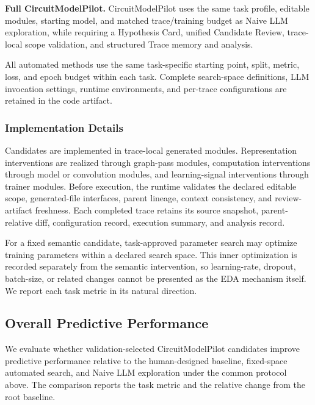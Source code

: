 \noindent\textbf{Full CircuitModelPilot.} CircuitModelPilot uses the same task profile, editable modules, starting model, and matched trace/training budget as Naive LLM exploration, while requiring a Hypothesis Card, unified Candidate Review, trace-local scope validation, and structured Trace memory and analysis.

All automated methods use the same task-specific starting point, split, metric, loss, and epoch budget within each task. Complete search-space definitions, LLM invocation settings, runtime environments, and per-trace configurations are retained in the code artifact.

\subsubsection{Implementation Details}
\label{sec:exp_implementation}

Candidates are implemented in trace-local generated modules. Representation interventions are realized through graph-pass modules, computation interventions through model or convolution modules, and learning-signal interventions through trainer modules. Before execution, the runtime validates the declared editable scope, generated-file interfaces, parent lineage, context consistency, and review-artifact freshness. Each completed trace retains its source snapshot, parent-relative diff, configuration record, execution summary, and analysis record.

For a fixed semantic candidate, task-approved parameter search may optimize training parameters within a declared search space. This inner optimization is recorded separately from the semantic intervention, so learning-rate, dropout, batch-size, or related changes cannot be presented as the EDA mechanism itself. We report each task metric in its natural direction.


\subsection{Overall Predictive Performance}
\label{sec:overall_performance}

We evaluate whether validation-selected CircuitModelPilot candidates improve predictive performance relative to the human-designed baseline, fixed-space automated search, and Naive LLM exploration under the common protocol above. The comparison reports the task metric and the relative change from the root baseline.

